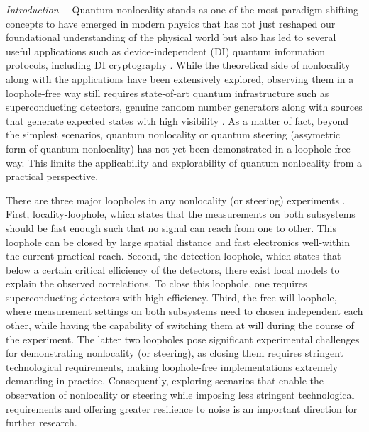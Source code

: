 \documentclass[pra,twocolumn,showpacs]{revtex4-2}
\theoremstyle{plain}
\theoremstyle{definition}
\theoremstyle{remark}
\begin{document}
{\it{Introduction---}} Quantum nonlocality \cite{Bell,Bell66} stands as one of the most paradigm-shifting concepts to have emerged in modern physics that has not just reshaped our foundational understanding of the physical world but also has led to several useful applications such as device-independent (DI) quantum information protocols, including DI cryptography \cite{DICrypto,NonlocalityReview}. While the theoretical side of nonlocality along with the applications have been extensively explored, observing them in a loophole-free way still requires state-of-art quantum infrastructure such as superconducting detectors, genuine random number generators along with sources that generate expected states with high visibility \cite{exp1,exp2,exp3,exp4,exp5,exp6,exp7}. As a matter of fact, beyond the simplest scenarios, quantum nonlocality or quantum steering (assymetric form of quantum nonlocality) \cite{Wiseman} has not yet been demonstrated in a loophole-free way. This limits the applicability and explorability of quantum nonlocality from a practical perspective.

There are three major loopholes in any nonlocality (or steering) experiments \cite{NonlocalityReview}. First, locality-loophole, which states that the measurements on both subsystems should be fast enough such that no signal can reach from one to other. This loophole can be closed by large spatial distance and fast electronics well-within the current practical reach. Second, the detection-loophole, which states that below a certain critical efficiency of the detectors, there exist local models to explain the observed correlations. To close this loophole, one requires superconducting detectors with high efficiency. Third, the free-will loophole, where measurement settings on both subsystems need to chosen independent each other, while having the capability of switching them at will during the course of the experiment. The latter two loopholes pose significant experimental challenges for demonstrating nonlocality (or steering), as closing them requires stringent technological requirements, making loophole-free implementations extremely demanding in practice. Consequently, exploring scenarios that enable the observation of nonlocality or steering while imposing less stringent technological requirements and offering greater resilience to noise is an important direction for further research.
\end{document}
